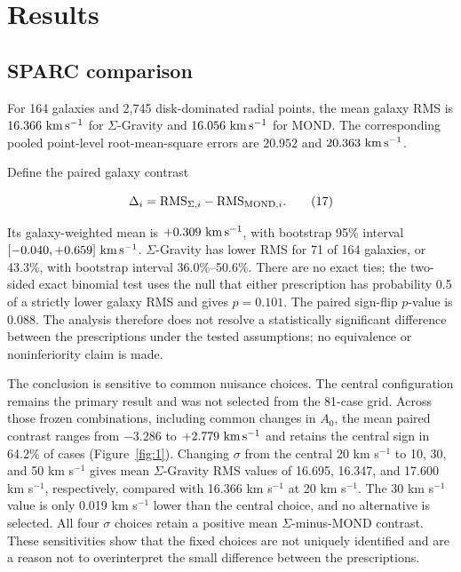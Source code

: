 \documentclass[utf8]{FrontiersinHarvard}
\begin{document}
\section{Results}\label{results}

\subsection{SPARC comparison}\label{sparc-comparison}

For 164 galaxies and 2,745 disk-dominated radial points, the mean galaxy RMS is \(16.366\ {\rm km\,s^{-1}}\) for \(\Sigma\)-Gravity and \(16.056\ {\rm km\,s^{-1}}\) for MOND. The corresponding pooled point-level root-mean-square errors are \(20.952\) and \(20.363\ {\rm km\,s^{-1}}\).

Define the paired galaxy contrast

\[
\Delta_i={\rm RMS}_{\Sigma,i}-{\rm RMS}_{{\rm MOND},i}.
\tag{17}
\]

Its galaxy-weighted mean is \(+0.309\ {\rm km\,s^{-1}}\), with bootstrap 95\% interval \([-0.040,+0.659]\ {\rm km\,s^{-1}}\). \(\Sigma\)-Gravity has lower RMS for 71 of 164 galaxies, or 43.3\%, with bootstrap interval 36.0\%--50.6\%. There are no exact ties; the two-sided exact binomial test uses the null that either prescription has probability 0.5 of a strictly lower galaxy RMS and gives \(p=0.101\). The paired sign-flip \(p\)-value is 0.088. The analysis therefore does not resolve a statistically significant difference between the prescriptions under the tested assumptions; no equivalence or noninferiority claim is made.

The conclusion is sensitive to common nuisance choices. The central configuration remains the primary result and was not selected from the 81-case grid. Across those frozen combinations, including common changes in \(A_0\), the mean paired contrast ranges from \(-3.286\) to \(+2.779\ {\rm km\,s^{-1}}\) and retains the central sign in 64.2\% of cases (Figure~\ref{fig:1}). Changing \(\sigma\) from the central 20 km s\(^{-1}\) to 10, 30, and 50 km s\(^{-1}\) gives mean \(\Sigma\)-Gravity RMS values of 16.695, 16.347, and 17.600 km s\(^{-1}\), respectively, compared with 16.366 km s\(^{-1}\) at 20 km s\(^{-1}\). The 30 km s\(^{-1}\) value is only 0.019 km s\(^{-1}\) lower than the central choice, and no alternative is selected. All four \(\sigma\) choices retain a positive mean \(\Sigma\)-minus-MOND contrast. These sensitivities show that the fixed choices are not uniquely identified and are a reason not to overinterpret the small difference between the prescriptions.
\end{document}
